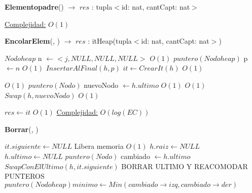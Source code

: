 \begin{Algoritmos}
\begin{algorithm}[H]{\textbf{Elementopadre}() $\to$ $res$ : tupla$<$id: nat, cantCapt: nat$>$}
\begin{algorithmic}[1]
			\medskip
			\Statex \underline{Complejidad:} $O(1)$
    	\end{algorithmic}   	
\end{algorithm}

\begin{algorithm}[H]{\textbf{EncolarElem}(, ) $\to$ $res$ : itHeap(tupla$<$id: nat, cantCapt: nat$>$)}
    	\begin{algorithmic}[1]
    	\State $Nodoheap$ n $\gets <j, NULL, NULL, NULL>$ \Comment $O(1)$
    	\State $puntero(Nodoheap)$ p $\gets n$  \Comment $O(1)$
		\State $InsertarAlFinal(h, p)$
		\State $it \gets CrearIt(h)$ \Comment $O(1)$

		 \Comment $O(1)$
			\State $puntero(Nodo)$ nuevoNodo $\gets h.ultimo$			\Comment $O(1)$
			 \Comment $O(1)$
				\State $Swap(h, nuevoNodo)$ \Comment $O(1)$
						
			\EndWhile
		\EndIf
		\State $res \gets it$ \Comment $O(1)$
			\medskip
			\Statex \underline{Complejidad:} $O(log(EC))$
    	\end{algorithmic}   	
\end{algorithm}

\begin{algorithm}[H]{\textbf{Borrar}(, )}
    	\begin{algorithmic}[1]
    			\State $it.siguiente \gets NULL$ \Comment Libera memoria $O(1)$
    			\State $h.raiz \gets NULL$
    			\State $h.ultimo \gets NULL$
    		\Else    		
    			\State $puntero(Nodo)$ cambiado $\gets h.ultimo$
				\State $SwapConElUltimo(h, it.siguiente)$
				\State BORRAR ULTIMO Y REACOMODAR PUNTEROS
					\State $puntero(Nodoheap) minimo \gets Min(cambiado \rightarrow izq, cambiado \rightarrow der)$
					

\end{algorithmic}
\end{algorithm}
\end{Algoritmos}

